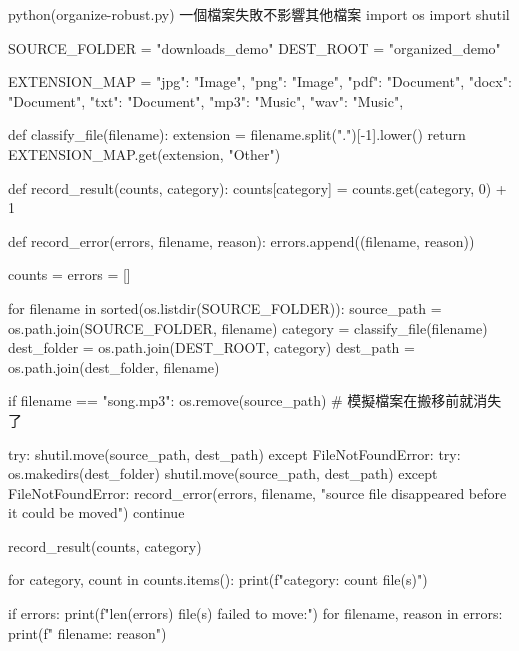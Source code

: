 \begin{example}{python}{(organize-robust.py) 一個檔案失敗不影響其他檔案}
import os
import shutil

SOURCE_FOLDER = "downloads_demo"
DEST_ROOT = "organized_demo"

EXTENSION_MAP = {
    "jpg": "Image", "png": "Image",
    "pdf": "Document", "docx": "Document", "txt": "Document",
    "mp3": "Music", "wav": "Music",
}


def classify_file(filename):
    extension = filename.split(".")[-1].lower()
    return EXTENSION_MAP.get(extension, "Other")


def record_result(counts, category):
    counts[category] = counts.get(category, 0) + 1


def record_error(errors, filename, reason):
    errors.append((filename, reason))


counts = {}
errors = []

for filename in sorted(os.listdir(SOURCE_FOLDER)):
    source_path = os.path.join(SOURCE_FOLDER, filename)
    category = classify_file(filename)
    dest_folder = os.path.join(DEST_ROOT, category)
    dest_path = os.path.join(dest_folder, filename)

    if filename == "song.mp3":
        os.remove(source_path)  # 模擬檔案在搬移前就消失了

    try:
        shutil.move(source_path, dest_path)
    except FileNotFoundError:
        try:
            os.makedirs(dest_folder)
            shutil.move(source_path, dest_path)
        except FileNotFoundError:
            record_error(errors, filename, "source file disappeared before it could be moved")
            continue

    record_result(counts, category)

for category, count in counts.items():
    print(f"{category}: {count} file(s)")

if errors:
    print(f"{len(errors)} file(s) failed to move:")
    for filename, reason in errors:
        print(f"  {filename}: {reason}")
\end{example}


